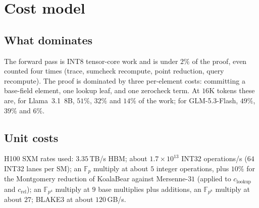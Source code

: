 \documentclass[11pt]{article}
\newcommand{\F}{\mathbb{F}}
\newcommand{\Fp}{\F_p}
\newcommand{\Fq}{\F_{p^4}}
\newcommand{\Fo}{\F_{p^8}}
\begin{document}
\section{Cost model}
\label{sec:cost}

\subsection{What dominates}

The forward pass is INT8 tensor-core work and is under \(2\%\) of the proof, even counted four times (trace, sumcheck recompute, point reduction, query recompute).
The proof is dominated by three per-element costs: committing a base-field element, one lookup leaf, and one zerocheck term.
At \(16\)K tokens these are, for Llama~3.1~8B, \(51\%\), \(32\%\) and \(14\%\) of the work; for GLM-5.3-Flash, \(49\%\), \(39\%\) and \(6\%\).

\subsection{Unit costs}

H100 SXM rates used: \(3.35\)\,TB/s HBM; about \(1.7\times 10^{13}\) INT32 operations/s (\(64\) INT32 lanes per SM); an \(\Fp\) multiply at about \(5\) integer operations, plus \(10\%\) for the Montgomery reduction of KoalaBear against Mersenne-\(31\) (applied to \(c_{\mathrm{lookup}}\) and \(c_{\mathrm{rel}}\)); an \(\Fq\) multiply at \(9\) base multiplies plus additions, an \(\Fo\) multiply at about \(27\); BLAKE3 at about \(120\)\,GB/s.
\end{document}
